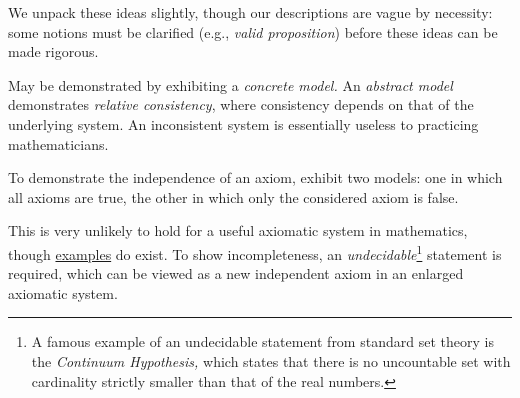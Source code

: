 We unpack these ideas slightly, though our descriptions are vague by necessity: some notions must be clarified (e.g., \emph{valid proposition}) before these ideas can be made rigorous.
\begin{description}\itemsep2pt
	\item[\normalfont\emph{Consistency}] May be demonstrated by exhibiting a \emph{concrete model.} An \emph{abstract model} demonstrates \emph{relative consistency}, where consistency depends on that of the underlying system. An inconsistent system is essentially useless to practicing mathematicians.
	\item[\normalfont\emph{Independence}] To demonstrate the independence of an axiom, exhibit two models: one in which all axioms are true, the other in which only the considered axiom is false. 
	\item[\normalfont\emph{Completeness}] This is very unlikely to hold for a useful axiomatic system in mathematics, though \href{https://en.wikipedia.org/wiki/Complete_theory}{examples} do exist. To show incompleteness, an \emph{undecidable}\footnote{%
	A famous example of an undecidable statement from standard set theory is the \emph{Continuum Hypothesis,} which states that there is no uncountable set with cardinality strictly smaller than that of the real numbers.%
} statement is required, which can be viewed as a new independent axiom in an enlarged axiomatic system. 
\end{description}


